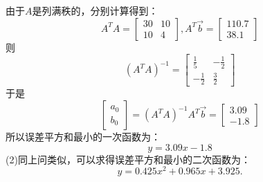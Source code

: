 由于$A$是列满秩的，分别计算得到：
\begin{equation*}
  A^TA=\begin{bmatrix}30&10\\10&4\end{bmatrix},A^T\vec{b}=\begin{bmatrix}110.7\\38.1\end{bmatrix}
\end{equation*}
则
\begin{equation*}
  (A^TA)^{-1}=\begin{bmatrix}\frac{1}{5}&-\frac{1}{2}\\-\frac{1}{2}&\frac{3}{2}\end{bmatrix}
\end{equation*}
于是
\begin{equation*}
 \begin{bmatrix}a_0\\b_0\end{bmatrix}=(A^TA)^{-1}A^T\vec{b}=\begin{bmatrix}3.09\\-1.8\end{bmatrix}
\end{equation*}
所以误差平方和最小的一次函数为：
\begin{equation*}
 y=3.09x-1.8
\end{equation*}
(2)同上问类似，可以求得误差平方和最小的二次函数为：
\begin{equation*}
 y=0.425x^2+0.965x+3.925.
\end{equation*}

